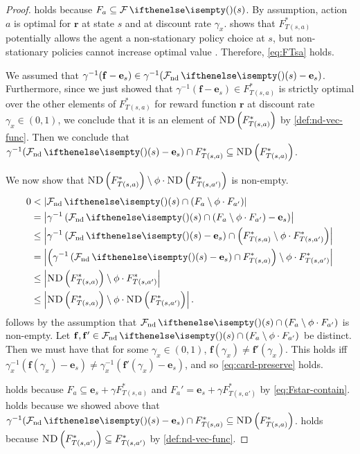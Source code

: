 \documentclass{article}
\renewcommand{\abs}[1]{\left|#1\right|}
\newcommand*{\prn}[1]{\left(#1\right)}
\newcommand*{\unitvec}[1][s]{\mathbf{e}_{#1}}
\newcommand*{\upsc}[1]{\text{\upshape\textsc{#1}}}
\newcommand*{\rf}{\mathbf{r}} %
\newcommand*{\f}{\mathbf{f}} %
\newcommand*{\ND}[1]{\upsc{ND}\prn{#1}}
\newcommand*{\inv}{^{-1}}
\theoremstyle{definition}
\begin{document}
\begin{appendices}
\begin{proof}
 holds because $F_a\subseteq \F(s)$. By assumption, action $a$ is optimal for $\rf$ at state $s$ and at discount rate $\gamma_x$.  shows that $F^*_{T(s,a)}$ potentially allows the agent a non-stationary policy choice at $s$, but  non-stationary policies cannot increase optimal value \citep{puterman_markov_2014}. Therefore, \cref{eq:FTsa} holds.

We assumed that $\gamma\inv (\f-\unitvec)\in \gamma\inv(\Fnd(s)-\unitvec)$. Furthermore, since we just showed that $\gamma\inv (\f-\unitvec)\in F^*_{T(s,a)}$ is strictly optimal over the other elements of $F^*_{T(s,a)}$ for reward function $\rf$ at discount rate $\gamma_x\in(0,1)$, we conclude that it is an element of $\ND{F^*_{T(s,a)}}$ by \cref{def:nd-vec-func}. Then we conclude that $\gamma\inv(\Fnd(s)-\unitvec)\cap F^*_{T(s,a)}\subseteq \ND{F^*_{T(s,a)}}$. 

We now show that $\ND{F^*_{T(s,a)}}\setminus \phi\cdot \ND{F^*_{T(s,a')}}$ is non-empty. 
\begin{align}
    0&<\abs{\Fnd(s)\cap \prn{F_a\setminus \phi\cdot F_{a'}}}\label{eq:nonempty-fnd-cap}\\
    &=\abs{\gamma\inv\prn{\Fnd(s)\cap \prn{F_a\setminus \phi\cdot F_{a'}}-\unitvec}}\label{eq:card-preserve}\\
    &\leq\abs{\gamma\inv\prn{\Fnd(s)-\unitvec}\cap \prn{F^*_{T(s,a)}\setminus\phi\cdot F^*_{T(s,a')}}}\label{eq:Fstar-convert}\\
    &=\abs{\prn{\gamma\inv\prn{\Fnd(s)-\unitvec}\cap F^*_{T(s,a)}}\setminus\phi\cdot F^*_{T(s,a')}}\\
    &\leq\abs{\ND{F^*_{T(s,a)}}\setminus\phi\cdot F^*_{T(s,a')}}\label{eq:contain-nd-fstar}\\
    &\leq\abs{\ND{F^*_{T(s,a)}}\setminus \phi\cdot \ND{F^*_{T(s,a')}}}.\label{eq:nd-containment-trivial}
\end{align}
 follows by the assumption that $\Fnd(s)\cap \prn{F_a\setminus \phi\cdot F_{a'}}$ is non-empty. Let $\f,\f'\in \Fnd(s)\cap \prn{F_a\setminus \phi\cdot F_{a'}}$ be distinct. Then we must have that for some $\gamma_x\in (0,1)$, $\f(\gamma_x)\neq \f'(\gamma_x)$. This holds iff $\gamma_x\inv(\f(\gamma_x)-\unitvec)\neq \gamma_x\inv(\f'(\gamma_x)-\unitvec)$, and so \cref{eq:card-preserve} holds.

 holds because $F_a\subseteq \unitvec+\gamma F^*_{T(s,a)}$ and $F_a'= \unitvec+\gamma F^*_{T(s,a')}$ by \cref{eq:Fstar-contain}.  holds because we showed above that $\gamma\inv(\Fnd(s)-\unitvec)\cap F^*_{T(s,a)}\subseteq \ND{F^*_{T(s,a)}}$.  holds because $\ND{F^*_{T(s,a')}}\subseteq F^*_{T(s,a')}$ by \cref{def:nd-vec-func}. 


\end{proof}
\end{appendices}
\end{document}
